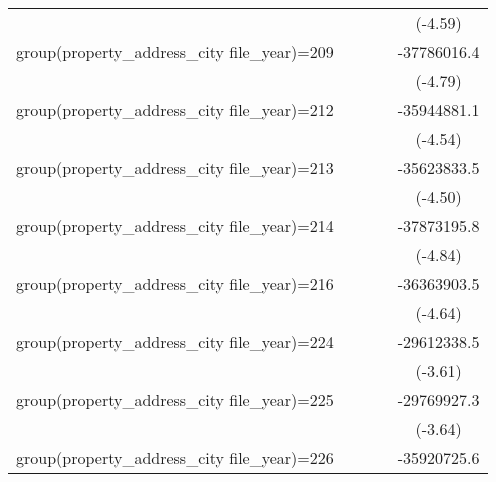 {\begin{tabular}{l*{4}{c}}
                    &                     &                     &                     &     (-4.59)         \\
\addlinespace
group(property\_address\_city file\_year)=209&                     &                     &                     & -37786016.4\sym{***}\\
                    &                     &                     &                     &     (-4.79)         \\
\addlinespace
group(property\_address\_city file\_year)=212&                     &                     &                     & -35944881.1\sym{***}\\
                    &                     &                     &                     &     (-4.54)         \\
\addlinespace
group(property\_address\_city file\_year)=213&                     &                     &                     & -35623833.5\sym{***}\\
                    &                     &                     &                     &     (-4.50)         \\
\addlinespace
group(property\_address\_city file\_year)=214&                     &                     &                     & -37873195.8\sym{***}\\
                    &                     &                     &                     &     (-4.84)         \\
\addlinespace
group(property\_address\_city file\_year)=216&                     &                     &                     & -36363903.5\sym{***}\\
                    &                     &                     &                     &     (-4.64)         \\
\addlinespace
group(property\_address\_city file\_year)=224&                     &                     &                     & -29612338.5\sym{***}\\
                    &                     &                     &                     &     (-3.61)         \\
\addlinespace
group(property\_address\_city file\_year)=225&                     &                     &                     & -29769927.3\sym{***}\\
                    &                     &                     &                     &     (-3.64)         \\
\addlinespace
group(property\_address\_city file\_year)=226&                     &                     &                     & -35920725.6\sym{***}\\

\end{tabular}}
